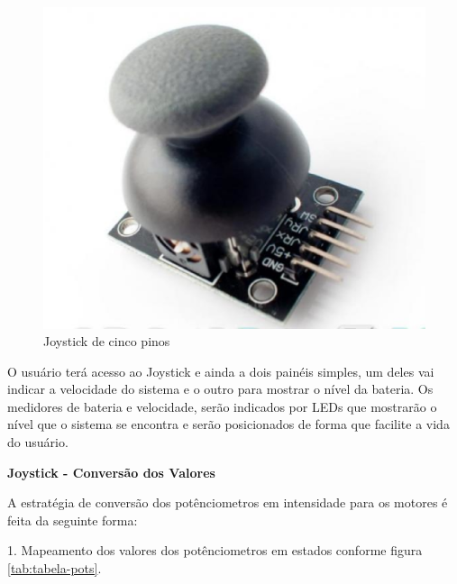 \begin{figure}[!htb]
	\centering
	\includegraphics[keepaspectratio=true,scale=0.5]{figuras/referencialteorico/joy.eps}
	\caption{Joystick de cinco pinos}
	\label{joy}
\end{figure}

O usuário terá acesso ao Joystick e ainda a dois painéis simples, um deles vai indicar a velocidade do sistema e o outro para mostrar o nível da bateria. Os medidores de bateria e velocidade, serão indicados por LEDs que mostrarão o nível que o sistema se encontra e serão posicionados de forma que facilite a vida do usuário.

\textbf{Joystick - Conversão dos Valores}

A estratégia de conversão dos potênciometros em intensidade para os motores é feita da seguinte forma:

1. Mapeamento dos valores dos potênciometros em estados conforme figura \ref{tab:tabela-pots}.

\begin{table}[!ht]
\centering
{}
\caption{Mapeamento dos valores conforme estado}
\label{tab:tabela-pots}
\end{table}

